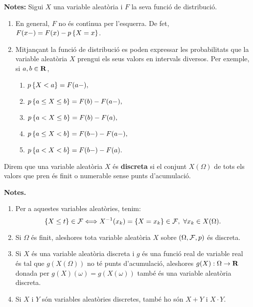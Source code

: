 {\bf Notes:} Sigui $X$ una variable aleat\`oria i $F$ la seva funci\'o de
distribuci\'o.
\begin{enumerate}
\item En general, $F$ no \'es cont\'{\i}nua per l'esquerra. 
De fet, \mbox{$F(x-) = F(x) - p\left\{X = x\right\}$.}

\item Mitjan\c{c}ant la funci\'o de distribuci\'o es poden expressar les
probabilitats
que la variable aleat\`oria $X$ prengui els seus valors en intervals diversos.
Per exemple, si $a, b \in {\bf R}$,

\begin{enumerate}

\item $p\left\{X < a\right\} = F(a-),$

\item $p\left\{a \leq X \leq b\right\} = F(b) - F(a-),$

\item $p\left\{a < X \leq b\right\} = F(b) - F(a),$

\item $p\left\{a \leq X < b\right\} = F(b-) - F(a-),$

\item $p\left\{a < X < b\right\} = F(b-) - F(a).$

\end{enumerate}

\end{enumerate}

\begin{defin}
Direm que una variable aleat\`oria $X$ \'es {\bf
discreta}
si el conjunt $X(\Omega)$ de tots els valors que pren \'es finit o numerable
sense punts
d'acumulaci\'o.
\end{defin}

{\bf Notes.}

\begin{enumerate}

\item Per a aquestes variables aleat\`ories, tenim:
\[
\{X\leq t\}\in {\cal F}\Longleftrightarrow X^{-1}(x_k)=\{ X=x_k\}\in {\cal F},\ 
\forall x_k\in X(\Omega).
\]

\item Si $\Omega$ \'es finit, aleshores tota variable aleat\`oria $X$ sobre
$(\Omega, {\cal F}, p)$ \'es discreta.

\item Si $X$ \'es una variable aleat\`oria discreta i $g$ \'es una 
funci\'o real de variable real \'es tal
que
$g(X(\Omega))$ no t\'e punts d'acumulaci\'o, aleshores $g(X) : \Omega \to {\bf R}$
donada
per $g(X)(\omega) = g(X(\omega))$ tamb\'e \'es una variable aleat\`oria discreta.

\item Si $X$ i $Y$ s\'on variables aleat\`ories discretes, tamb\'e ho
s\'on $X+Y$ i $X\cdot Y$.
\end{enumerate}

